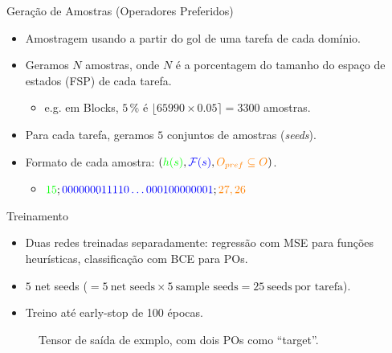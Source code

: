 \documentclass{beamer}
\begin{document}
\begin{frame}{Geração de Amostras (Operadores Preferidos)}
\begin{itemize}
  \item Amostragem usando \alert{\bfsrs} a partir do gol de uma tarefa de cada domínio.
  \pause
  \item Geramos $N$ amostras, onde $N$ é a porcentagem do tamanho do espaço de estados (FSP) de cada tarefa.
    \begin{itemize}
      \item e.g. em Blocks, $5\,\%$ é $\lfloor 65990 \times 0.05 \rceil = 3300$ amostras.
    \end{itemize}
  \pause
  \item Para cada tarefa, geramos \alert{$5$} conjuntos de amostras (\emph{seeds}).
  \pause
  \item Formato de cada amostra: $({\color{green} h(s)}, {\color{blue} \mathcal{F}(s)}, {\color{orange} O_{pref} \subseteq O})$.
    \begin{itemize}
      \item ${\color{green} 15};{\color{blue} 000000011110\ldots000100000001};{\color{orange} 27,26}$
    \end{itemize}
\end{itemize}
\end{frame}

\begin{frame}{Treinamento}
\begin{itemize}
  \item Duas redes treinadas separadamente: \alert{regressão} com MSE para funções heurísticas, \alert{classificação} com BCE para POs.
  \pause
  \item $5$ net seeds ($= 5~\text{net seeds} \times 5~\text{sample seeds} = 25~\text{seeds}~\text{por tarefa}$).
  \pause
  \item Treino até \alert{early-stop} de 100 épocas. %
\end{itemize}

\pause
\begin{figure}[tb]
\caption[]{Tensor de saída de exmplo, com dois POs como ``target''.}
\centering
{}
\label{fig:po-tensor}
\end{figure}

\end{frame}
\end{document}
